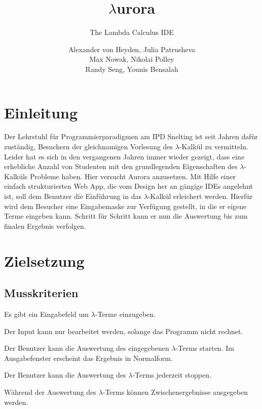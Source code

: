\documentclass[parskip=full,11pt,twoside]{scrartcl}
\title{\textbf{$\lambda$}urora}
\subtitle{The Lambda Calculus IDE}
\author{Alexander von Heyden, Julia Patrusheva\\
 Max Nowak, Nikolai Polley\\
 Randy Seng, Younis Bensalah}
\begin{document}
\maketitle
\newpage
\tableofcontents

\newpage
\section{Einleitung}
Der Lehrstuhl für Programmierparadigmen am IPD Snelting ist seit Jahren dafür zuständig, Besuchern der gleichnamigen Vorlesung des $\lambda$-Kalkül zu vermitteln. Leider hat es sich in den vergangenen Jahren immer wieder gezeigt, dass eine erhebliche Anzahl von Studenten mit den grundlegenden Eigenschaften des $\lambda$-Kalküls Probleme haben. Hier versucht Aurora anzusetzen. Mit Hilfe einer einfach strukturierten Web App, die vom Design her an gängige IDEs angelehnt ist, soll dem Benutzer die Einführung in das $\lambda$-Kalkül erleichert werden. Hierfür wird dem Besucher eine Eingabemaske zur Verfügung gestellt, in die er eigene Terme eingeben kann. Schritt für Schritt kann er nun die Auswertung bis zum finalen Ergebnis verfolgen.


\newpage
\section{Zielsetzung}


\subsection{Musskriterien}

Es gibt ein Eingabefeld um $\lambda$-Terme einzugeben.

Der Input kann nur bearbeitet werden, solange das Programm nicht rechnet.

Der Benutzer kann die Auswertung des eingegebenen $\lambda$-Terms starten. Im Ausgabefenster erscheint das Ergebnis in Normalform. 

Der Benutzer kann die Auswertung des $\lambda$-Terms jederzeit stoppen.

Während der Auswertung des $\lambda$-Terms können Zwischenergebnisse ausgegeben werden.
\end{document}
